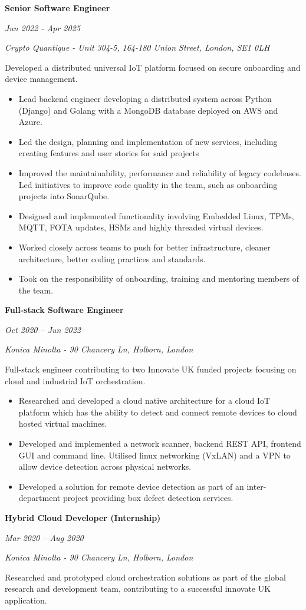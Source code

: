 \documentclass[11pt,a4paper]{article}
\newcommand{\cventry}[5]{
    \noindent
    \begin{minipage}[t]{0.3\textwidth}
        \raggedright
        \textbf{#1}
        
        \textit{#2}
    \end{minipage}%
    \hfill
    \begin{minipage}[t]{0.7\textwidth}
        \raggedright
        \textit{#3}
        
        #4
        
        #5
    \end{minipage}
    
    \vspace{8pt}
}
\begin{document}
\cventry{Senior Software Engineer}{Jun 2022 - Apr 2025}{Crypto Quantique - Unit 304-5, 164-180 Union Street, London, SE1 0LH}{}{
Developed a distributed universal IoT platform focused on secure onboarding and device management.
\begin{itemize}[leftmargin=15pt, itemsep=2pt]
    \item Lead backend engineer developing a distributed system across Python (Django) and Golang with a MongoDB database deployed on AWS and Azure.
    \item Led the design, planning and implementation of new services, including creating features and user stories for said projects
    \item Improved the maintainability, performance and reliability of legacy codebases. Led initiatives to improve code quality in the team, such as onboarding projects into SonarQube.
    \item Designed and implemented functionality involving Embedded Linux, TPMs, MQTT, FOTA updates, HSMs and highly threaded virtual devices.
    \item Worked closely across teams to push for better infrastructure, cleaner architecture, better coding practices and standards.
    \item Took on the responsibility of onboarding, training and mentoring members of the team.
\end{itemize}
}

\cventry{Full-stack Software Engineer}{Oct 2020 – Jun 2022}{Konica Minolta - 90 Chancery Ln, Holborn, London}{}{
Full-stack engineer contributing to two Innovate UK funded projects focusing on cloud and industrial IoT orchestration.
\begin{itemize}[leftmargin=15pt, itemsep=2pt]
    \item Researched and developed a cloud native architecture for a cloud IoT platform which has the ability to detect and connect remote devices to cloud hosted virtual machines.
    \item Developed and implemented a network scanner, backend REST API, frontend GUI and command line. Utilised linux networking (VxLAN) and a VPN to allow device detection across physical networks.
    \item Developed a solution for remote device detection as part of an inter-department project providing box defect detection services.
\end{itemize}
}

\cventry{Hybrid Cloud Developer (Internship)}{Mar 2020 – Aug 2020}{Konica Minolta - 90 Chancery Ln, Holborn, London}{}{
Researched and prototyped cloud orchestration solutions as part of the global research and development team, contributing to a successful innovate UK application.
}
\end{document}

